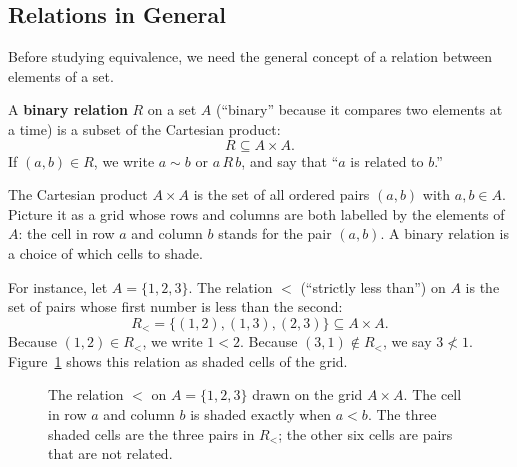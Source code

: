\subsection{Relations in General}

Before studying equivalence, we need the general concept of a relation between elements of a set.

\begin{definition}[Relation]
A \textbf{binary relation} $R$ on a set $A$ (``binary'' because it compares two elements at a time) is a subset of the Cartesian product:
\[
R \subseteq A \times A.
\]
If $(a, b) \in R$, we write $a \sim b$ or $a \, R \, b$, and say that ``$a$ is related to $b$.''
\end{definition}

The Cartesian product $A \times A$ is the set of all ordered pairs $(a, b)$ with $a, b \in A$. Picture it as a grid whose rows and columns are both labelled by the elements of $A$: the cell in row $a$ and column $b$ stands for the pair $(a, b)$. A binary relation is a choice of which cells to shade.

For instance, let $A = \{1, 2, 3\}$. The relation $<$ (``strictly less than'') on $A$ is the set of pairs whose first number is less than the second:
\[
R_{<} = \{(1, 2), (1, 3), (2, 3)\} \subseteq A \times A.
\]
Because $(1, 2) \in R_{<}$, we write $1 < 2$. Because $(3, 1) \notin R_{<}$, we say $3 \not< 1$. Figure~\ref{15:fig-relation-grid} shows this relation as shaded cells of the grid.

\begin{figure}[htbp]
\centering
{}
\caption{The relation $<$ on $A = \{1, 2, 3\}$ drawn on the grid $A \times A$. The cell in row $a$ and column $b$ is shaded exactly when $a < b$. The three shaded cells are the three pairs in $R_{<}$; the other six cells are pairs that are not related.}
\label{15:fig-relation-grid}
\end{figure}


